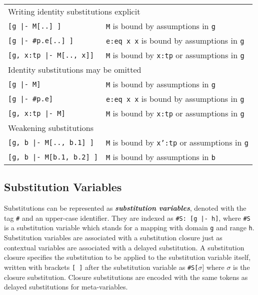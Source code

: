 \documentclass[11pt]{article}
\begin{document}
\begin{center}
\begin{tabular}{ l l}
\multicolumn{2}{l}{Writing identity substitutions explicit}\\[0.5em]
\texttt{[g |- M[..] ]} & \texttt{M} is bound by assumptions in \texttt{g}\\
\texttt{[g |- \#p.e[..] ]} & \texttt{e:eq x x} is bound by assumptions in \texttt{g}\\
\texttt{[g, x:tp |- M[.., x]]} & \texttt{M} is bound by \texttt{x:tp} or assumptions in \texttt{g} \\[1em]
\multicolumn{2}{l}{Identity substitutions may be omitted}\\[0.5em]
\texttt{[g |- M]} & \texttt{M} is bound by assumptions in \texttt{g}\\
\texttt{[g |- \#p.e]} & \texttt{e:eq x x} is bound by assumptions in \texttt{g}\\
\texttt{[g, x:tp |- M]} & \texttt{M} is bound by \texttt{x:tp} or assumptions in \texttt{g} \\[1em]
\multicolumn{2}{l}{Weakening substitutions}\\[0.5em]
\texttt{[g, b |- M[.., b.1] ]} & \texttt{M} is bound by \texttt{x':tp} or assumptions in \texttt{g} \\
\texttt{[g, b |- M[b.1, b.2] ]} & \texttt{M} is bound by assumptions in \texttt{b} \\
\end{tabular}
\end{center}



\subsection{Substitution Variables}
Substitutions can be represented as \textit{\textbf{substitution variables}}, denoted with the tag \texttt{\#} and an upper-case identifier. They are indexed as \texttt{\#S: [g |- h]}, where \texttt{\#S} is a substitution variable which stands for a mapping with domain \texttt{g} and range \texttt{h}. Substitution variables are associated with a substitution closure just as contextual variables are associated with a delayed substitution. A substitution closure specifies the substitution to be applied to the substitution variable itself, written with brackets \texttt{[ ]} after the substitution variable as \texttt{\#S[}$\sigma${]} where $\sigma$ is the closure substitution. Closure substitutions are encoded with the same tokens as delayed substitutions for meta-variables.
\end{document}
